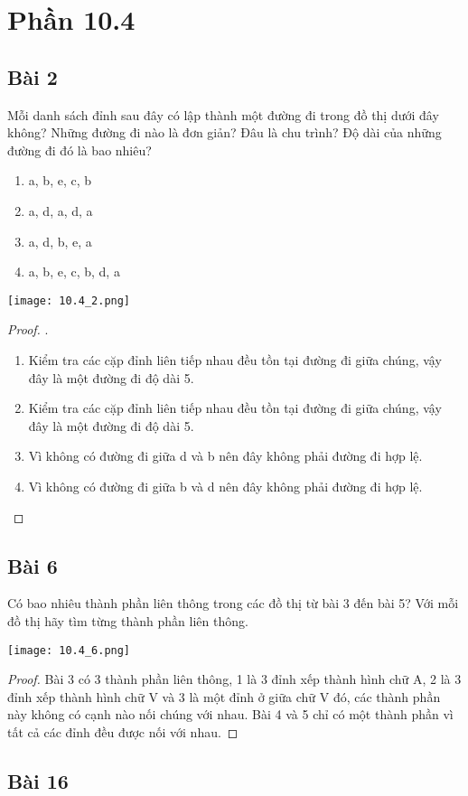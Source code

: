 \section*{Phần 10.4}
\subsection*{Bài 2}
Mỗi danh sách đỉnh sau đây có lập thành một đường đi trong đồ thị dưới đây không? Những đường đi nào là đơn giản? Đâu là chu trình? Độ dài của những đường đi đó là bao nhiêu?
\begin{enumerate}[label=\alph*)]
    \item a, b, e, c, b
    \item a, d, a, d, a
    \item a, d, b, e, a
    \item a, b, e, c, b, d, a
\end{enumerate}
\begin{center}
    \texttt{[image: 10.4\_2.png]}
\end{center}
\begin{proof}.
    \begin{enumerate}[label=\alph*)]
        \item Kiểm tra các cặp đỉnh liên tiếp nhau đều tồn tại đường đi giữa chúng, vậy đây là một đường đi độ dài 5.
        \item Kiểm tra các cặp đỉnh liên tiếp nhau đều tồn tại đường đi giữa chúng, vậy đây là một đường đi độ dài 5.
        \item Vì không có đường đi giữa d và b nên đây không phải đường đi hợp lệ.
        \item Vì không có đường đi giữa b và d nên đây không phải đường đi hợp lệ.
    \end{enumerate}
\end{proof}
\subsection*{Bài 6}
Có bao nhiêu thành phần liên thông trong các đồ thị từ bài 3 đến bài 5? Với mỗi đồ thị hãy tìm từng thành phần liên thông.
\begin{center}
    \texttt{[image: 10.4\_6.png]}
\end{center}
\begin{proof}
    Bài 3 có 3 thành phần liên thông, 1 là 3 đỉnh xếp thành hình chữ A, 2 là 3 đỉnh xếp thành hình chữ V và 3 là một đỉnh ở giữa chữ V đó, các thành phần này không có cạnh nào nối chúng với nhau. Bài 4 và 5 chỉ có một thành phần vì tất cả các đỉnh đều được nối với nhau.
\end{proof}
\subsection*{Bài 16}
